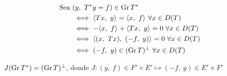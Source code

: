 \begin{note}

\begin{align*}
\text{Sea } &(y,\ T\adj y = f) \in \gr T\adj \\
&\iff \prodint[]{Tx}{y} = \prodint[]{x}{f} \ \forall x \in D(T) \\
&\iff -\prodint[]{x}{f} + \prodint[]{Tx}{y} = 0 \ \forall x \in D(T) \\
&\iff  \prodint[]{(x,\ Tx)}{(-f,\ y)}  = 0 \ \forall x \in D(T) \\
&\iff  (-f,\ y) \in (\gr T)\ort  \ \forall x \in D(T) 
\end{align*}

$J(\gr T\adj) = (\gr T)\ort $, donde $J: (y,\ f) \in  F' \times E' \mapsto (-f,\ y) \in E' \times F'$

\end{note}












